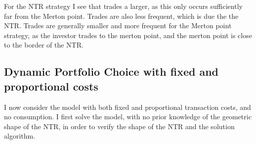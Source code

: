 \documentclass[11pt]{article}
\begin{document}
For the NTR strategy I see that trades a larger, as this only occurs sufficiently far from the Merton point.
Trades are also less frequent, which is due the the \ac{NTR}.
Trades are generally smaller and more frequent for the Merton point strategy, as the investor trades to the merton point, and the merton point is close to the border of the NTR.

\subsection{Dynamic Portfolio Choice with fixed and proportional costs} \label{Subsection: Fixed_Proportional}
I now consider the model with both fixed and proportional transaction costs, and no consumption.
I first solve the model, with no prior knowledge of the geometric shape of the \ac{NTR}, in order to verify the shape of the \ac{NTR} and the solution algorithm.
\end{document}
